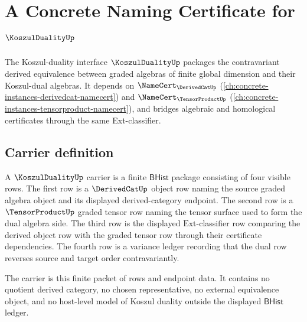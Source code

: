 \chapter{A Concrete Naming Certificate for $\KoszulDualityUp$}
\label{ch:concrete-instances-koszulduality-namecert}

The Koszul-duality interface $\KoszulDualityUp$ packages the contravariant derived equivalence between graded algebras of finite global dimension and their Koszul-dual algebras. It depends on $\NameCert_{\DerivedCatUp}$ (\autoref{ch:concrete-instances-derivedcat-namecert}) and $\NameCert_{\TensorProductUp}$ (\autoref{ch:concrete-instances-tensorproduct-namecert}), and bridges algebraic and homological certificates through the same Ext-classifier.

\section{Carrier definition}
\label{sec:koszulduality-carrier}

\begin{definition}
\label{def:koszulduality-bhist-ext-carrier}
A $\KoszulDualityUp$ carrier is a finite $\mathsf{BHist}$ package consisting
of four visible rows. The first row is a $\DerivedCatUp$ object row naming the
source graded algebra object and its displayed derived-category endpoint. The
second row is a $\TensorProductUp$ graded tensor row naming the tensor surface
used to form the dual algebra side. The third row is the displayed
$\mathrm{Ext}$-classifier row comparing the derived object row with the graded
tensor row through their certificate dependencies. The fourth row is a variance
ledger recording that the dual row reverses source and target order
contravariantly.

The carrier is this finite packet of rows and endpoint data. It contains no
quotient derived category, no chosen representative, no external equivalence
object, and no host-level model of Koszul duality outside the displayed
$\mathsf{BHist}$ ledger.
\end{definition}

